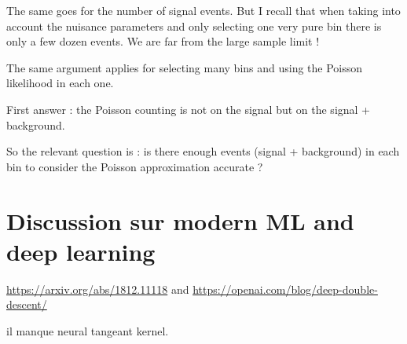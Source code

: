 The same goes for the number of signal events.
But I recall that when taking into account the nuisance parameters and only selecting one very pure bin there is only a few dozen events.
We are far from the large sample limit !

The same argument applies for selecting many bins and using the Poisson likelihood in each one.

First answer : the Poisson counting is not on the signal but on the signal + background.

So the relevant question is : is there enough events (signal + background) in each bin to consider the Poisson approximation accurate ?






\section{Discussion sur modern ML and deep learning} %
\label{sec:discussion_sur_modern_ml_and_deep_learning}


\url{https://arxiv.org/abs/1812.11118} and 
\url{https://openai.com/blog/deep-double-descent/}

il manque neural tangeant kernel.




